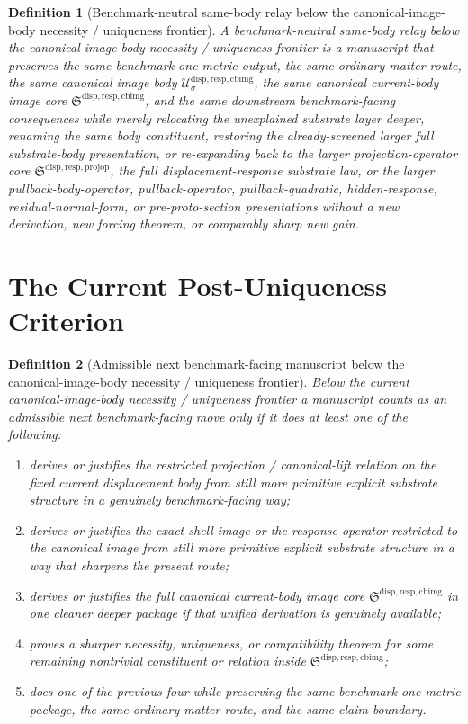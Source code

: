 \documentclass[11pt]{article}
\newcommand{\ProjectionOperatorCore}{\mathfrak S^{\mathrm{disp,resp,projop}}}
\newcommand{\CurrentBodyImageCore}{\mathfrak S^{\mathrm{disp,resp,cbimg}}}
\newcommand{\CanonicalImageBody}[1]{\mathcal U_{#1}^{\mathrm{disp,resp,cbimg}}}
\newtheorem{definition}{Definition}
\begin{document}
\begin{definition}[Benchmark-neutral same-body relay below the canonical-image-body necessity / uniqueness frontier]
A \emph{benchmark-neutral same-body relay below the canonical-image-body necessity / uniqueness frontier} is a manuscript that preserves the same benchmark one-metric output, the same ordinary matter route, the same canonical image body \(\CanonicalImageBody{\sigma}\), the same canonical current-body image core \(\CurrentBodyImageCore\), and the same downstream benchmark-facing consequences while merely relocating the unexplained substrate layer deeper, renaming the same body constituent, restoring the already-screened larger full substrate-body presentation, or re-expanding back to the larger projection-operator core \(\ProjectionOperatorCore\), the full displacement-response substrate law, or the larger pullback-body-operator, pullback-operator, pullback-quadratic, hidden-response, residual-normal-form, or pre-proto-section presentations without a new derivation, new forcing theorem, or comparably sharp new gain.
\end{definition}

\section{The Current Post-Uniqueness Criterion}

\begin{definition}[Admissible next benchmark-facing manuscript below the canonical-image-body necessity / uniqueness frontier]
Below the current canonical-image-body necessity / uniqueness frontier a manuscript counts as an admissible next benchmark-facing move only if it does at least one of the following:
\begin{enumerate}
    \item derives or justifies the restricted projection / canonical-lift relation on the fixed current displacement body from still more primitive explicit substrate structure in a genuinely benchmark-facing way;
    \item derives or justifies the exact-shell image or the response operator restricted to the canonical image from still more primitive explicit substrate structure in a way that sharpens the present route;
    \item derives or justifies the full canonical current-body image core \(\CurrentBodyImageCore\) in one cleaner deeper package if that unified derivation is genuinely available;
    \item proves a sharper necessity, uniqueness, or compatibility theorem for some remaining nontrivial constituent or relation inside \(\CurrentBodyImageCore\);
    \item does one of the previous four while preserving the same benchmark one-metric package, the same ordinary matter route, and the same claim boundary.
\end{enumerate}
\end{definition}
\end{document}
